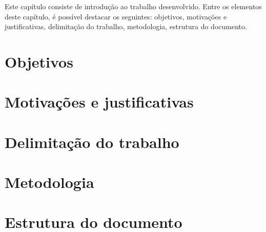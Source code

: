 Este capítulo consiste de introdução ao trabalho desenvolvido. Entre os elementos deste capítulo, é possível destacar os seguintes: objetivos, motivações e justificativas, delimitação do trabalho, metodologia, estrutura do documento.

\section{Objetivos}
\section{Motivações e justificativas}
\section{Delimitação do trabalho}
\section{Metodologia}
\section{Estrutura do documento}